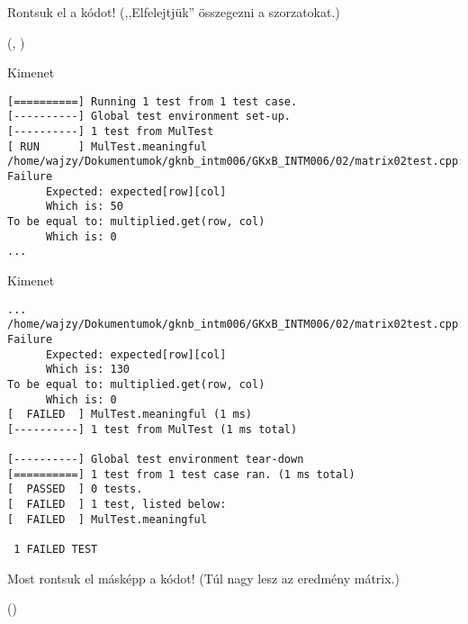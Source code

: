 \documentclass[usenames,dvipsnames,aspectratio=169]{beamer}
\begin{document}
\begin{frame}
  Rontsuk el a kódot! (,,Elfelejtjük'' összegezni a szorzatokat.)
  \begin{exampleblock}{ %
    (, %
    )}
    
  \end{exampleblock}
\end{frame}

\begin{frame}[fragile]
  \begin{block}{Kimenet}
    \footnotesize
    \begin{verbatim}
[==========] Running 1 test from 1 test case.
[----------] Global test environment set-up.
[----------] 1 test from MulTest
[ RUN      ] MulTest.meaningful
/home/wajzy/Dokumentumok/gknb_intm006/GKxB_INTM006/02/matrix02test.cpp:25: Failure
      Expected: expected[row][col]
      Which is: 50
To be equal to: multiplied.get(row, col)
      Which is: 0
...
\end{verbatim}
  \end{block}
\end{frame}

\begin{frame}[fragile]
  \footnotesize
  \begin{block}{Kimenet}
    \begin{verbatim}
...
/home/wajzy/Dokumentumok/gknb_intm006/GKxB_INTM006/02/matrix02test.cpp:25: Failure
      Expected: expected[row][col]
      Which is: 130
To be equal to: multiplied.get(row, col)
      Which is: 0
[  FAILED  ] MulTest.meaningful (1 ms)
[----------] 1 test from MulTest (1 ms total)

[----------] Global test environment tear-down
[==========] 1 test from 1 test case ran. (1 ms total)
[  PASSED  ] 0 tests.
[  FAILED  ] 1 test, listed below:
[  FAILED  ] MulTest.meaningful

 1 FAILED TEST
\end{verbatim}
  \end{block}
\end{frame}

\begin{frame}
  Most rontsuk el másképp a kódot! (Túl nagy lesz az eredmény mátrix.)
  \begin{exampleblock}{ %
    ()}
    
  \end{exampleblock}
\end{frame}
\end{document}
